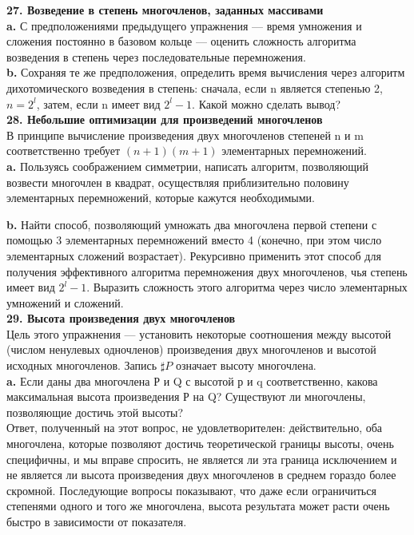 \documentclass{mai_book}
\begin{document}
\noindent
\textbf{27. Возведение в степень многочленов, заданных массивами}\\

\textbf{a.} С предположениями предыдущего упражнения — время умножения и сложения постоянно в базовом кольце — оценить сложность алгоритма возведения в степень через последовательные перемножения.\\

\textbf{b.} Сохраняя те же предположения, определить время вычисления через алгоритм дихотомического возведения в степень: сначала, если n является степенью 2, $n = 2^{l}$, затем, если n имеет вид $2^{l} - 1$. Какой можно сделать вывод?\\

\noindent
\textbf{28. Небольшие оптимизации для произведений многочленов}\\

В принципе вычисление произведения двух многочленов степеней n и m соответственно требует $(n+1)(m+1)$ элементарных перемножений.\\

\textbf{a.} Пользуясь соображением симметрии, написать алгоритм, позволяющий возвести многочлен в квадрат, осуществляя приблизительно половину элементарных перемножений, которые кажутся необходимыми.
\newpage

\textbf{b.} Найти способ, позволяющий умножать два многочлена первой степени с помощью 3 элементарных перемножений вместо 4 (конечно, при этом число элементарных сложений возрастает). Рекурсивно применить этот способ для получения эффективного алгоритма перемножения двух многочленов, чья степень имеет вид $2^{l} - 1$. Выразить сложность этого алгоритма через число элементарных умножений и сложений.\\

\noindent
\textbf{29. Высота произведения двух многочленов}\\

Цель этого упражнения — установить некоторые соотношения между высотой (числом ненулевых одночленов) произведения двух многочленов и высотой исходных многочленов. Запись $\sharp P$ означает высоту многочлена.\\

\textbf{a.} Если даны два многочлена Р и Q с высотой р и q соответственно, какова максимальная высота произведения Р на Q? Существуют ли многочлены, позволяющие достичь этой высоты?\\

Ответ, полученный на этот вопрос, не удовлетворителен: действительно, оба многочлена, которые позволяют достичь теоретической границы высоты, очень специфичны, и мы вправе спросить, не является ли эта граница исключением и не является ли высота произведения двух многочленов в среднем гораздо более скромной. Последующие вопросы показывают, что даже если ограничиться степенями одного и того же многочлена, высота результата может расти очень быстро в зависимости от показателя.\\
\end{document}
